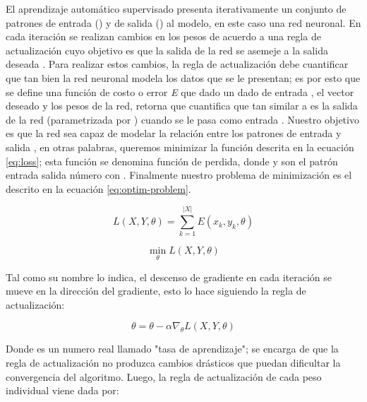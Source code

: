 El aprendizaje automático supervisado presenta iterativamente un conjunto de patrones de entrada () y de salida () al modelo, en este caso una red neuronal. En cada iteración se realizan cambios en los pesos \jim{\theta} de acuerdo a una regla de actualización cuyo objetivo es que la salida de la red se asemeje a la salida deseada \cite{Gurney1997}. Para realizar estos cambios, la regla de actualización debe cuantificar que tan bien la red neuronal modela los datos que se le presentan; es por esto que se define una función de costo o error \textit{E} que dado un dado de entrada , el vector deseado  y los pesos \jim{\theta} de la red, retorna  que cuantifica que tan similar a  es la salida de la red (parametrizada por \jim{\theta}) cuando se le pasa como entrada . Nuestro objetivo es que la red sea capaz de modelar la relación entre los patrones de entrada  y salida , en otras palabras, queremos minimizar la función descrita en la ecuación \ref{eq:loss}; esta función se denomina función de perdida, donde  y  son el patrón entrada salida número  con . Finalmente nuestro problema de minimización es el descrito en la ecuación \ref{eq:optim-problem}.

\begin{equation}
    \label{eq:loss}
    L(X, Y, \theta) = \sum_{k = 1}^{|X|} E(x_k, y_k, \theta)
\end{equation}

\begin{equation}
    \label{eq:optim-problem}
    \min_{\theta} L(X, Y, \theta)
\end{equation}

Tal como su nombre lo indica, el descenso de gradiente en cada iteración se mueve en la dirección del gradiente, esto lo hace siguiendo la regla de actualización:

\begin{equation}
    \label{eq:gd-update-rule}
    \theta = \theta - \alpha \nabla_{\theta} L(X, Y, \theta)
\end{equation}

Donde  es un numero real llamado "tasa de aprendizaje"; \jim{\alpha} se encarga de que la regla de actualización no produzca cambios drásticos que puedan dificultar la convergencia del algoritmo. Luego, la regla de actualización de cada peso individual  viene dada por:

